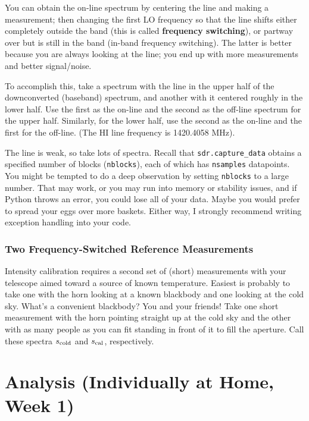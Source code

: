 \documentclass[11pt,preprint]{aastex}
\begin{document}
You can obtain the on-line
spectrum by centering the line and making a measurement; then changing
the first LO frequency so that the line shifts either completely
outside the band (this is called {\bf frequency switching}), or partway
over but is still in the band (in-band frequency
switching). The latter is better because you are always looking at
the line; you end up with more measurements and better signal/noise.

To accomplish this, take a spectrum with the line in the upper
half of the downconverted (baseband) spectrum, and another with it centered roughly in
the lower half. Use the first as the on-line and the second as the
off-line spectrum for the upper half. Similarly, for the lower half,
use the second as the on-line and the first for the off-line.  (The HI
line frequency is 1420.4058 MHz).

The line is weak, so take lots of spectra. Recall that
{\tt sdr.capture\_data} obtains a specified number of blocks ({\tt nblocks}),
each of which has {\tt nsamples} datapoints.
You might be tempted
to do a deep observation by setting {\tt nblocks} to a large number. That
may work, or you may run into memory or stability issues, and if Python throws
an error, you could lose all of your data. Maybe you would prefer to spread
your eggs over more baskets.
Either way, I strongly recommend writing exception handling into your code.

\subsubsection{Two Frequency-Switched Reference Measurements}
\label{sec:blackbody}

\noindent
Intensity calibration requires a second set of (short) measurements
with your telescope aimed toward a source of known temperature.
Easiest is probably to take one with the horn
looking at a known blackbody and one looking at the cold sky. What's a
convenient blackbody? You and your friends! Take one short
measurement with the horn pointing straight up at the cold sky and the
other with as many people as you can fit standing in front of it to
fill the aperture. Call these spectra
$s_{\rm cold}$ and $s_{\rm cal}$, respectively.


\section{Analysis (Individually at Home, Week 1)} \label{analysis}
\end{document}

